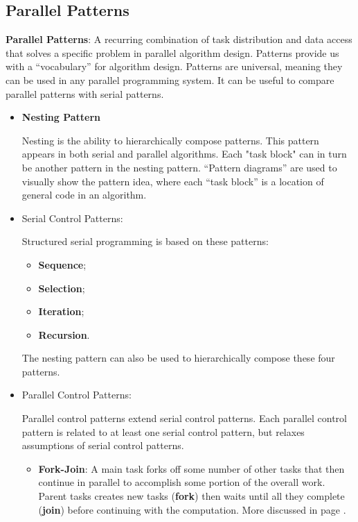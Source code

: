 \subsection{Parallel Patterns}
\par \textbf{Parallel Patterns}: A recurring combination of task distribution and data access that solves a specific problem in parallel algorithm design. Patterns provide us with a \enquote{vocabulary} for algorithm design. Patterns are universal, meaning they can be used in any parallel programming system. It can be useful to compare parallel patterns with serial patterns.
\begin{itemize}
    \item \textbf{{\large Nesting Pattern}}
    \par Nesting is the ability to hierarchically compose patterns. This pattern appears in both serial and parallel algorithms. Each "task block" can in turn be another pattern in the nesting pattern. “Pattern diagrams” are used to visually show the pattern idea, where each “task block” is a location of general code in an algorithm.
%
\clearpage
%
    \item Serial Control Patterns:
    \par Structured serial programming is based on these patterns:
    \begin{itemize}
        \item \textbf{Sequence};
        \item \textbf{Selection};
        \item \textbf{Iteration};
        \item \textbf{Recursion}.
    \end{itemize}
    \par The nesting pattern can also be used to hierarchically compose these four patterns.
    \item Parallel Control Patterns:
    \par Parallel control patterns extend serial control patterns. Each parallel control pattern is related to at least one serial control pattern, but relaxes assumptions of serial control patterns.
    \begin{itemize}
        \item \textbf{Fork-Join}: A main task forks off some number of other tasks that then
continue in parallel to accomplish some portion of the overall
work. Parent tasks creates new tasks (\textbf{fork}) then waits until all they
complete (\textbf{join}) before continuing with the computation. More discussed in page \pageref{forkjoin}.

\end{itemize}
\end{itemize}
